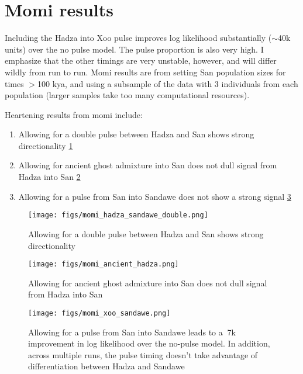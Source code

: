 \section{Momi results}

Including the Hadza into Xoo pulse improves log likelihood substantially ($\sim$40k units) over the no pulse model. The pulse proportion is also very high. I emphasize that the other timings are very unstable, however, and will differ wildly from run to run. Momi results are from setting San population sizes for times $>$100 kya, and using a subsample of the data with 3 individuals from each population (larger samples take too many computational resources).

Heartening results from momi include:
\begin{enumerate}
\item Allowing for a double pulse between Hadza and San shows strong directionality \ref{fig:double}
\item Allowing for ancient ghost admixture into San does not dull signal from Hadza into San \ref{fig:ghost}
\item Allowing for a pulse from San into Sandawe does not show a strong signal \ref{fig:sandawe}
\end{enumerate}


\begin{figure}[h!]
\texttt{[image: figs/momi\_hadza\_sandawe\_double.png]}
\caption{Allowing for a double pulse between Hadza and San shows strong directionality}
\label{fig:double}
\end{figure}


\begin{figure}[h!]
\texttt{[image: figs/momi\_ancient\_hadza.png]}
\caption{Allowing for ancient ghost admixture into San does not dull signal from Hadza into San}
\label{fig:ghost}
\end{figure}

\begin{figure}[h!]
\texttt{[image: figs/momi\_xoo\_sandawe.png]}
\caption{Allowing for a pulse from San into Sandawe leads to a $~$7k improvement in log likelihood over the no-pulse model. In addition, across multiple runs, the pulse timing doesn't take advantage of differentiation between Hadza and Sandawe}
\label{fig:sandawe}
\end{figure}

